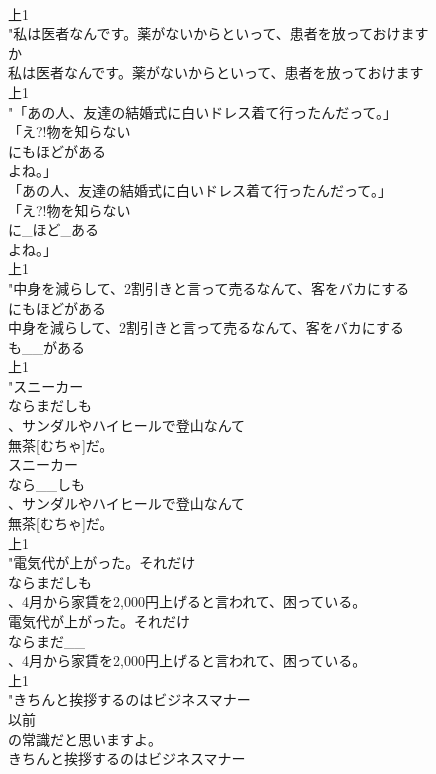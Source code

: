 \documentclass[8pt]{extreport}
\begin{document}
\begin{CJK}{UTF8}{min}
\\	上1
\\	"私は医者なんです。薬がないからといって、患者を放っておけます
\\	か
\\	私は医者なんです。薬がないからといって、患者を放っておけます
\\	上1
\\	"「あの人、友達の結婚式に白いドレス着て行ったんだって。」
\\	「え?!物を知らない
\\	にもほどがある
\\	よね。」
\\	「あの人、友達の結婚式に白いドレス着て行ったんだって。」
\\	「え?!物を知らない
\\	に_ほど_ある
\\	よね。」
\\	上1
\\	"中身を減らして、2割引きと言って売るなんて、客をバカにする
\\	にもほどがある
\\	中身を減らして、2割引きと言って売るなんて、客をバカにする
\\	も__がある
\\	上1
\\	"スニーカー
\\	ならまだしも
\\	、サンダルやハイヒールで登山なんて
\\	無茶[むちゃ]だ。
\\	スニーカー
\\	なら__しも
\\	、サンダルやハイヒールで登山なんて
\\	無茶[むちゃ]だ。
\\	上1
\\	"電気代が上がった。それだけ
\\	ならまだしも
\\	、4月から家賃を2,000円上げると言われて、困っている。
\\	電気代が上がった。それだけ
\\	ならまだ__
\\	、4月から家賃を2,000円上げると言われて、困っている。
\\	上1
\\	"きちんと挨拶するのはビジネスマナー
\\	以前
\\	の常識だと思いますよ。
\\	きちんと挨拶するのはビジネスマナー

\end{CJK}
\end{document}
